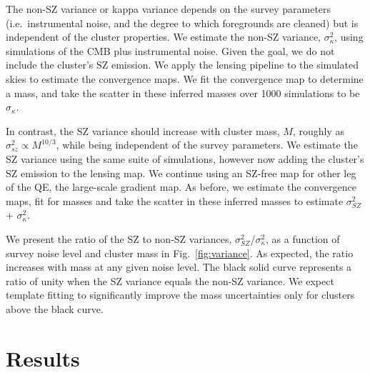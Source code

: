 The non-SZ variance or kappa variance depends on the survey parameters (i.e.~instrumental noise, and the degree to which foregrounds are cleaned) but is independent of the cluster properties. 
We estimate the non-SZ variance, $\sigma_{\kappa}^{2}$, using simulations of the CMB plus instrumental noise. 
Given the goal, we do not include the cluster's SZ emission.  
We apply the lensing pipeline to the simulated skies to estimate the convergence maps. 
We fit the convergence map  to determine  a mass, and take the scatter in these inferred masses over 1000 simulations to be $\sigma_{\kappa}$. 


In contrast, the SZ variance should increase with cluster mass, $M$, roughly as $\sigma_{sz}^2 \propto M^{10/3}$, while being independent of the survey parameters. 
We estimate the SZ variance using the same suite of simulations, however now adding the cluster's SZ emission to the lensing map. 
We continue using an SZ-free map for other leg of the QE, the large-scale gradient map. 
As before, we estimate the convergence maps, fit for masses and take the scatter in these inferred masses to estimate $\sigma_{SZ}^{2}$ + $\sigma_{\kappa}^{2}$.

We present the ratio of the SZ to non-SZ variances, $\sigma_{SZ}^{2}$/$\sigma_{\kappa}^{2}$, as a function of survey noise level and cluster mass in Fig.~\ref{fig:variance}.  
As expected, the ratio increases with mass at any given noise level. 
The black solid curve represents a ratio of unity when the SZ variance equals the non-SZ variance. 
We expect template fitting to significantly improve the mass uncertainties only for clusters above the black curve. 

\section{Results}
\label{temp_fit_sec_results}




